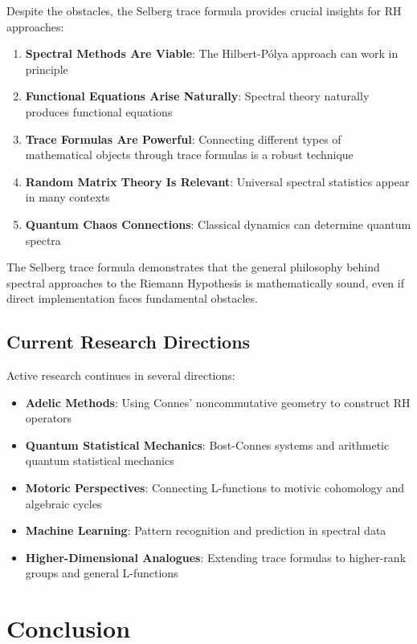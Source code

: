 Despite the obstacles, the Selberg trace formula provides crucial insights for RH approaches:

\begin{enumerate}
\item \textbf{Spectral Methods Are Viable}: The Hilbert-Pólya approach can work in principle
\item \textbf{Functional Equations Arise Naturally}: Spectral theory naturally produces functional equations
\item \textbf{Trace Formulas Are Powerful}: Connecting different types of mathematical objects through trace formulas is a robust technique
\item \textbf{Random Matrix Theory Is Relevant}: Universal spectral statistics appear in many contexts
\item \textbf{Quantum Chaos Connections}: Classical dynamics can determine quantum spectra
\end{enumerate}

\begin{remark}
The Selberg trace formula demonstrates that the general philosophy behind spectral approaches to the Riemann Hypothesis is mathematically sound, even if direct implementation faces fundamental obstacles.
\end{remark}

\subsection{Current Research Directions}

Active research continues in several directions:

\begin{itemize}
\item \textbf{Adelic Methods}: Using Connes' noncommutative geometry to construct RH operators
\item \textbf{Quantum Statistical Mechanics}: Bost-Connes systems and arithmetic quantum statistical mechanics
\item \textbf{Motoric Perspectives}: Connecting L-functions to motivic cohomology and algebraic cycles
\item \textbf{Machine Learning}: Pattern recognition and prediction in spectral data
\item \textbf{Higher-Dimensional Analogues}: Extending trace formulas to higher-rank groups and general L-functions
\end{itemize}

\section{Conclusion}
\label{sec:conclusion}

